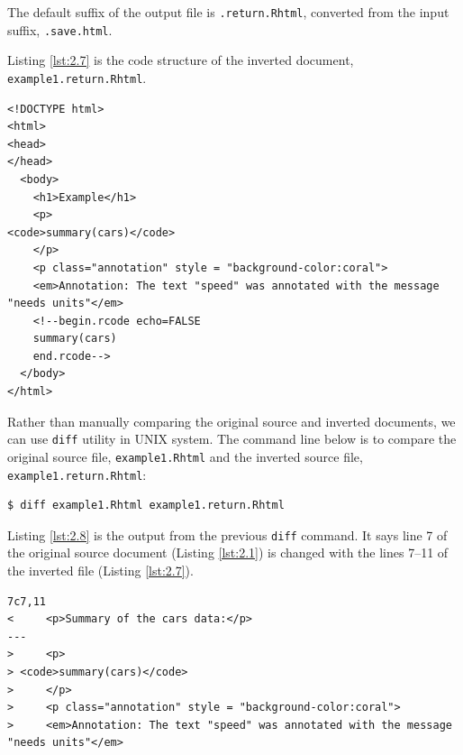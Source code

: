 \documentclass[a4paper, 12pt]{report}
\begin{document}
The default suffix of the output file is \texttt{.return.Rhtml}, converted from the input suffix, \texttt{.save.html}.

Listing \ref{lst:2.7} is the code structure of the inverted document, \texttt{example1.return.Rhtml}.
\begin{lstlisting}[caption={\texttt{example1.return.Rhtml}}, escapechar=\|, label={lst:2.7}]
<!DOCTYPE html>
<html>
<head>
</head>
  <body>
    <h1>Example</h1>
    <p>
<code>summary(cars)</code>
    </p>
    <p class="annotation" style = "background-color:coral">
    <em>Annotation: The text "speed" was annotated with the message "needs units"</em>
    <!--begin.rcode echo=FALSE
    summary(cars)
    end.rcode-->
  </body>
</html>
\end{lstlisting}

Rather than manually comparing the original source and inverted documents, we can use \texttt{diff} utility in UNIX system. The command line below is to compare the original source file, \texttt{example1.Rhtml} and the inverted source file, \texttt{example1.return.Rhtml}:
\begin{lstlisting}[numbers=none, frame=none]
$ diff example1.Rhtml example1.return.Rhtml
\end{lstlisting}

Listing \ref{lst:2.8} is the output from the previous \texttt{diff} command. It says line 7 of the original source document (Listing \ref{lst:2.1}) is changed with the lines 7--11 of the inverted file (Listing \ref{lst:2.7}).
\begin{lstlisting}[caption={Output from \texttt{diff}}, label={lst:2.8}]
7c7,11
<     <p>Summary of the cars data:</p>
---
>     <p>
> <code>summary(cars)</code>
>     </p>
>     <p class="annotation" style = "background-color:coral">
>     <em>Annotation: The text "speed" was annotated with the message "needs units"</em>
\end{lstlisting}
\end{document}
